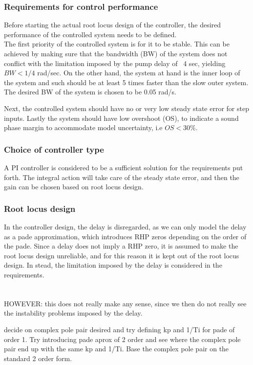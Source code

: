 \subsubsection{Requirements for control performance}
Before starting the actual root locus design of the controller, the desired performance of the controlled system needs to be defined. \\
The first priority of the controlled system is for it to be stable. This can be achieved by making sure that the bandwidth (BW) of the system does not conflict with the limitation imposed by the pump delay of ~4 sec, yielding $BW < 1/4 $ rad/sec. On the other hand, the system at hand is the inner loop of the system and such should be at least 5 times faster than the slow outer system. The desired BW of the system is chosen to be 0.05 rad/s. 


Next, the controlled system should have no or very low steady state error for step inputs. Lastly the system should have low overshoot (OS), to indicate a sound phase margin to accommodate model uncertainty, i.e $OS < 30\%$. 

\subsubsection{Choice of controller type}
A PI controller is considered to be a sufficient solution for the requirements put forth. The integral action will take care of the steady state error, and then the gain can be chosen based on root locus design.

\subsubsection{Root locus design}
In the controller design, the delay is disregarded, as we can only model the delay as a pade approximation, which introduces RHP zeros depending on the order of the pade. Since a delay does not imply a RHP zero, it is assumed to make the root locus design unreliable, and for this reason it is kept out of the root locus design. In stead, the limitation imposed by the delay is considered in the requirements. \\
\\
\\
HOWEVER: this does not really make any sense, since we then do not really see the instability problems imposed by the delay. 

decide on complex pole pair desired and try defining kp and 1/Ti for pade of order 1. Try introducing pade aprox of 2 order and see where the complex pole pair end up with the same kp and 1/Ti. Base the complex pole pair on the standard 2 order form. 







